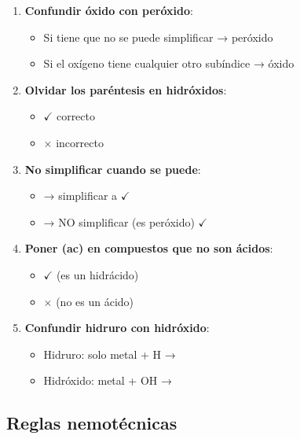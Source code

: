 \begin{enumerate}
    \item \textbf{Confundir óxido con peróxido}:
    \begin{itemize}
        \item Si tiene  que no se puede simplificar → peróxido
        \item Si el oxígeno tiene cualquier otro subíndice → óxido
    \end{itemize}

    \item \textbf{Olvidar los paréntesis en hidróxidos}:
    \begin{itemize}
        \item {} $\checkmark$ correcto
        \item {} $\times$ incorrecto
    \end{itemize}

    \item \textbf{No simplificar cuando se puede}:
    \begin{itemize}
        \item {} → simplificar a  $\checkmark$
        \item {} → NO simplificar (es peróxido) $\checkmark$
    \end{itemize}

    \item \textbf{Poner (ac) en compuestos que no son ácidos}:
    \begin{itemize}
        \item {} $\checkmark$ (es un hidrácido)
        \item {} $\times$ (no es un ácido)
    \end{itemize}

    \item \textbf{Confundir hidruro con hidróxido}:
    \begin{itemize}
        \item Hidruro: solo metal + H → 
        \item Hidróxido: metal + OH → 
    \end{itemize}
\end{enumerate}

\subsection{Reglas nemotécnicas}

